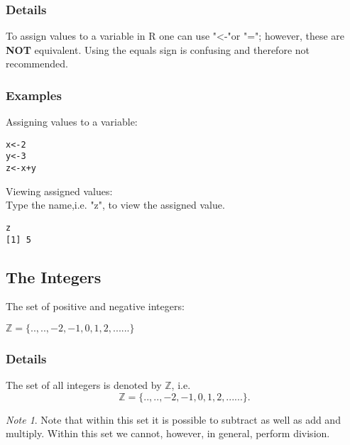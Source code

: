 \documentclass[12pt,a4paper]{article}
\theoremstyle{regla}
\theoremstyle{remark}
\newtheorem{notes}{Note}[section]
\theoremstyle{definition}
\theoremstyle{nonumberbreak}
\begin{document}
\subsubsection{Details}
To assign values to a variable in R one can use "$\texttt{<-}$"\text{ }or "$\texttt{=}$"; however, these are {\bf NOT} equivalent. Using the equals sign is confusing and therefore not recommended.
\subsubsection{Examples}
\begin{xmpl} 
Assigning values to a variable:
\begin{lstlisting} 
x<-2
y<-3
z<-x+y 
\end{lstlisting} 
\end{xmpl} 

\begin{xmpl} 

Viewing assigned values:\\
Type the name,i.e. "z", to view the assigned value. 

\begin{lstlisting} 
z
[1] 5
\end{lstlisting}

\end{xmpl} 



\subsection{The Integers}
\begin{fbox}
\begin{minipage}{0.97\textwidth}
The set of positive and negative integers:

$\mathbb{Z} = \{.., .., -2, -1, 0, 1, 2, ......\}$

\end{minipage}
\end{fbox}
\subsubsection{Details}
\begin{defn}
The set of all integers is denoted by $\mathbb{Z}$, i.e.
$$\mathbb{Z} = \{.., .., -2, -1, 0, 1, 2, ......\} .$$
\end{defn}

\begin{notes}
Note that within this set it is possible to subtract as well as add and multiply. Within this set we cannot, however, in general, perform division.
\end{notes}
\end{document}
